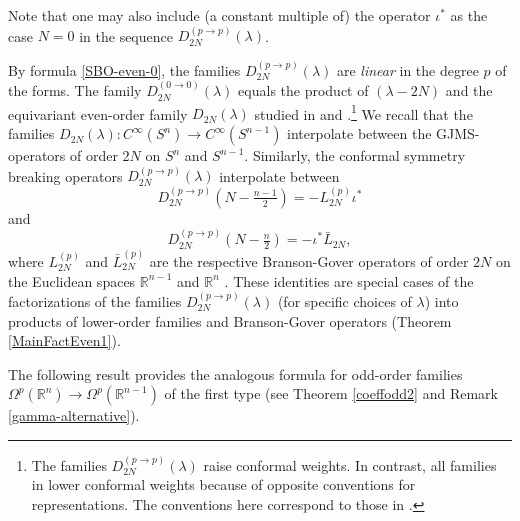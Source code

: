 \documentclass[a4paper,12pt,reqno]{amsart}
\numberwithin{theorem}{subsection}
\numberwithin{equation}{section}
\begin{document}
Note that one may also include (a constant multiple of) the operator $\iota^*$
as the case $N=0$ in the sequence $D_{2N}^{(p \to p)}(\lambda)$.

By formula \eqref{SBO-even-0}, the families $D_{2N}^{(p \to p)}(\lambda)$ are
{\em linear} in the degree $p$ of the forms. The family $D_{2N}^{(0 \to
0)}(\lambda)$ equals the product of $(\lambda-2N)$ and the equivariant
even-order family $D_{2N}(\lambda)$ studied in \cite{Juhl} and
\cite{koss}.\footnote{The families $D_{2N}^{(p\to p)}(\lambda)$ raise conformal
weights. In contrast, all families in \cite{Juhl} lower conformal weights
because of opposite conventions for representations. The conventions here
correspond to those in \cite{koss}.} We recall that the families
$D_{2N}(\lambda): C^\infty(S^n) \to C^\infty(S^{n-1})$ interpolate between the
GJMS-operators of order $2N$ on $S^n$ and $S^{n-1}$. Similarly, the conformal
symmetry breaking operators $D_{2N}^{(p \to p)}(\lambda)$ interpolate between
\begin{equation}\label{interpol-1}
   D_{2N}^{(p \to p)}(N\!-\!\tfrac{n-1}{2}) = -L_{2N}^{(p)} \iota^*
\end{equation}
and
\begin{equation}\label{interpol-2}
   D_{2N}^{(p \to p)}(N\!-\!\tfrac{n}{2}) = -\iota^* \bar{L}_{2N},
\end{equation}
where $L_{2N}^{(p)}$ and $\bar{L}_{2N}^{(p)}$ are the respective Branson-Gover
operators of order $2N$ on the Euclidean spaces ${\mathbb{R}}^{n-1}$ and ${\mathbb{R}}^n$
\cite{BransonGover}. These identities are special cases of the factorizations
of the families $D_{2N}^{(p \to p)}(\lambda)$ (for specific choices of
$\lambda$) into products of lower-order families and Branson-Gover operators
(Theorem \ref{MainFactEven1}).

The following result provides the analogous formula for odd-order families
$\Omega^p({\mathbb{R}}^n) \to \Omega^p({\mathbb{R}}^{n-1})$ of the first type (see Theorem
\ref{coeffodd2} and Remark \ref{gamma-alternative}).
\end{document}

